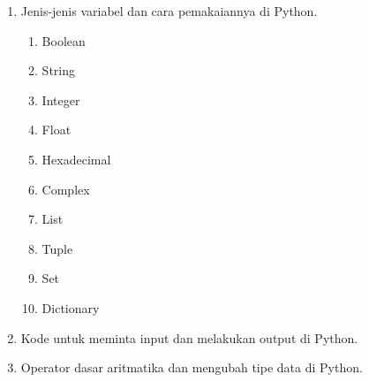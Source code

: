 \begin{enumerate}
\item Jenis-jenis variabel dan cara pemakaiannya di Python.

\begin{enumerate}
\item Boolean


\item String


\item Integer


\item Float


\item Hexadecimal


\item Complex


\item List


\item Tuple


\item Set


\item Dictionary


\end{enumerate}

\item Kode untuk meminta input dan melakukan output di Python.


\item Operator dasar aritmatika dan mengubah tipe data di Python.


\end{enumerate}
